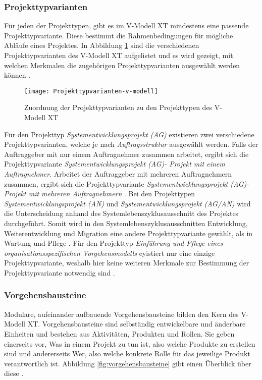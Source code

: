 \subsubsection{Projekttypvarianten}
Für jeden der Projekttypen, gibt es im V-Modell XT mindestens eine passende Projekttypvariante. Diese bestimmt die Rahmenbedingungen für mögliche Abläufe eines Projektes. In Abbildung \ref{fig:Projekttypvarianten} sind die verschiedenen Projekttypvarianten des V-Modell XT aufgelistet und es wird gezeigt, mit welchen Merkmalen die zugehörigen Projekttypvarianten ausgewählt werden können \cite{2004vmodell}.   
\begin{figure}[htp]
\begin{center}
  \texttt{[image: Projekttypvarianten-v-modell]} %
  \caption{Zuordnung der Projekttypvarianten zu den Projekttypen des V-Modell XT \cite{2004vmodell}}
  \label{fig:Projekttypvarianten}
\end{center}
\end{figure}

Für den Projekttyp \textit{Systementwicklungsprojekt (AG)} existieren zwei verschiedene Projekttypvarianten, welche je nach \textit{Auftragsstruktur} ausgewählt werden. Falls der Auftraggeber mit nur einem Auftragnehmer zusammen arbeitet, ergibt sich die Projekttypvariante \textit{Systementwicklungsprojekt (AG)- Projekt mit einem Auftragnehmer}. Arbeitet der Auftraggeber mit mehreren Auftragnehmern zusammen, ergibt sich die Projekttypvariante \textit{Systementwicklungsprojekt (AG)- Projekt mit mehreren Auftragnehmern} \cite{2004vmodell}.\newline
Bei den Projekttypen \textit{Systementwicklungsprojekt (AN)} und \textit{Systementwicklungsprojekt (AG/AN)} wird die Unterscheidung anhand des Systemlebenszyklusausschnitt des Projektes durchgeführt. Somit wird in den Systemlebenszyklusausschnitten Entwicklung, Weiterentwicklung und Migration eine andere Projekttypvariante gewählt, als in Wartung und Pflege \cite{2004vmodell}.\newline 
Für den Projekttyp \textit{Einführung und Pflege eines organisationsspezifischen Vorgehensmodells} eyistiert nur eine einzige Projekttypvariante, weshalb hier keine weiteren Merkmale zur Bestimmung der Projekttypvariante notwendig sind \cite{2004vmodell}.\newline

  
 \subsubsection{Vorgehensbausteine}
Modulare, aufeinander aufbauende Vorgehensbausteine bilden den Kern des V-Modell XT. Vorgehensbausteine sind selbständig entwickelbare und änderbare Einheiten und bestehen aus Aktivitäten, Produkten und Rollen. Sie geben einerseits vor, \grqq Was\grqq{}  in einem Projekt zu tun ist, also welche Produkte zu erstellen sind und andererseits \grqq Wer\grqq, also welche konkrete Rolle für das jeweilige Produkt verantwortlich ist. Abbildung \ref{fig:vorgehensbausteine} gibt einen Überblick über diese \cite{ruf2008, 2004vmodell}.\newline

